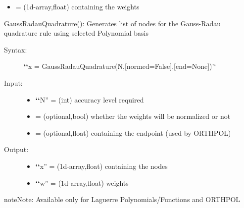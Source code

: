 \documentclass[letterpaper,10pt,english]{sphinxmanual}
\begin{document}
\begin{fulllineitems}
\begin{fulllineitems}
\begin{description}
\begin{itemize}
\item {} 
 = (1d-array,float) containing the weights

\end{itemize}

\end{description}

\end{fulllineitems}


\begin{fulllineitems}
\label{index:SpectralToolbox.Spectral1D.Poly1D.GaussRadauQuadrature}
GaussRadauQuadrature(): Generates list of nodes for the Gauss-Radau quadrature rule using selected Polynomial basis
\begin{description}
\item[{Syntax:}] \leavevmode
{\color{red}\bfseries{}{}`{}`}x = GaussRadauQuadrature(N,{[}normed=False{]},{[}end=None{]})'`

\item[{Input:}] \leavevmode\begin{itemize}
\item {} 
{\color{red}\bfseries{}{}`{}`}N'' = (int) accuracy level required

\item {} 
 = (optional,bool) whether the weights will be normalized or not

\item {} 
 = (optional,float) containing the endpoint (used by ORTHPOL)

\end{itemize}

\item[{Output:}] \leavevmode\begin{itemize}
\item {} 
{\color{red}\bfseries{}{}`{}`}x'' = (1d-array,float) containing the nodes

\item {} 
{\color{red}\bfseries{}{}`{}`}w'' = (1d-array,float) weights

\end{itemize}

\end{description}

\begin{notice}{note}{Note:}
Available only for Laguerre Polynomials/Functions and ORTHPOL
\end{notice}


\end{fulllineitems}
\end{fulllineitems}
\end{document}

